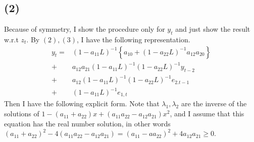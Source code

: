 \documentclass{article}
\begin{document}
\subsection{(2)}
 Because of symmetry, I show the procedure only for $y_t$ and just show the result w.r.t $z_t$. By $(2),(3)$, I have the following representation.
\begin{align*}
	y_t = &(1-a_{11}L)^{-1}\left\{ a_{10}+(1-a_{22}L)^{-1} a_{12}a_{20} \right\} \\
	+ &a_{12}a_{21}(1-a_{11}L)^{-1}(1-a_{22}L)^{-1}y_{t-2} \\
	+ &a_{12}(1-a_{11}{L})^{-1}(1-a_{22}L)^{-1}e_{2.t-1}\\
	+ &(1-a_{11}L)^{-1}e_{1,t}
\end{align*}
Then I have the following explicit form. Note that $\lambda_1, \lambda_2$ are the inverse of the solutions of $1-(a_{11} + a_{22})x + (a_{11}a_{22} - a_{12}a_{21})x^2$, and I assume that this equation has the real number solution, in other words $(a_{11} +a_{22})^2 -4(a_{11}a_{22} - a_{12}a_{21}) = (a_{11} -aa_{22})^2 + 4a_{12}a_{21} \geq 0$.
\end{document}
